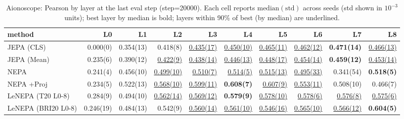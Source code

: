 \begin{table}[t]
\centering
\scriptsize
\caption{Aionoscope: Pearson by layer at the last eval step (step=20000). Each cell reports $\mathrm{median}(\mathrm{std})$ across seeds (std shown in $10^{-3}$ units); best layer by median is bold; layers within 90\% of best (by median) are underlined.}
\label{tab:aiono_last_step_by_layer_pearson}
\begin{tabular}{lrrrrrrrrr}
\toprule
method & L0 & L1 & L2 & L3 & L4 & L5 & L6 & L7 & L8 \\
\midrule
JEPA (CLS) & 0.000(0) & 0.354(13) & 0.418(8) & \underline{0.435(17)} & \underline{0.450(10)} & \underline{0.465(11)} & \underline{0.462(12)} & \textbf{0.471(14)} & \underline{0.466(13)} \\
JEPA (Mean) & 0.235(6) & 0.390(12) & \underline{0.422(9)} & \underline{0.438(14)} & \underline{0.446(13)} & \underline{0.448(17)} & \underline{0.454(14)} & \textbf{0.459(12)} & \underline{0.453(14)} \\
NEPA & 0.241(4) & 0.456(10) & \underline{0.499(10)} & \underline{0.510(7)} & \underline{0.514(5)} & \underline{0.515(13)} & \underline{0.495(33)} & 0.341(54) & \textbf{0.518(5)} \\
NEPA +Proj & 0.234(5) & 0.522(13) & \underline{0.568(10)} & \underline{0.599(11)} & \textbf{0.608(7)} & \underline{0.607(9)} & \underline{0.553(11)} & 0.508(10) & 0.466(7) \\
LeNEPA (T20 L0-8) & 0.284(9) & 0.494(10) & \underline{0.562(14)} & \underline{0.569(12)} & \textbf{0.579(9)} & \underline{0.578(10)} & \underline{0.578(6)} & \underline{0.576(8)} & \underline{0.575(6)} \\
LeNEPA (BRI20 L0-8) & 0.246(19) & 0.484(13) & 0.542(9) & \underline{0.560(14)} & \underline{0.561(10)} & \underline{0.546(16)} & \underline{0.565(10)} & \underline{0.566(12)} & \textbf{0.604(5)} \\
\bottomrule
\end{tabular}
\end{table}
